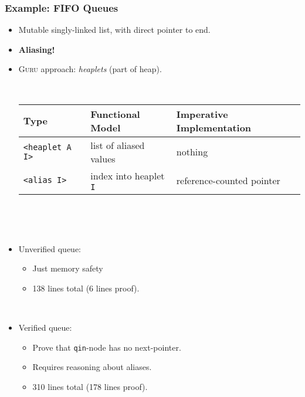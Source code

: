 \documentclass[10pt]{beamer}
\begin{document}
\begin{frame}
\frametitle{Example: FIFO Queues}

\begin{itemize}
\item Mutable singly-linked list, with direct pointer to end.
\item \textbf{Aliasing!}
\item \textsc{Guru} approach: \emph{heaplets} (part of heap).

\ 

{\small
\begin{tabular}{|l|l|l|}
\hline
Type & Functional Model & Imperative Implementation \\
\hline
\texttt{<heaplet A I>} & list of aliased values & nothing\\
\texttt{<alias I>} & index into heaplet \texttt{I} & reference-counted pointer\\
\hline
\end{tabular}}

\ 

\ 

\item Unverified queue:
\begin{itemize}
\item Just memory safety
\item 138 lines total (6 lines proof).
\end{itemize}

\ 

\item Verified queue:
\begin{itemize}
\item Prove that \texttt{qin}-node has no next-pointer.
\item Requires reasoning about aliases.
\item 310 lines total (178 lines proof).
\end{itemize}

\end{itemize}
\end{frame}
\end{document}
